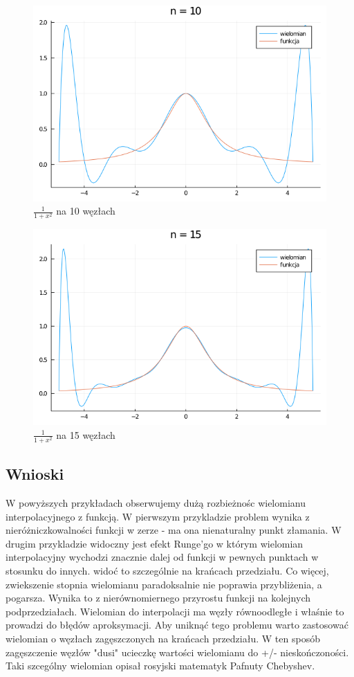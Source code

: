 \documentclass[12pt]{article}
\begin{document}
\begin{figure}[h!]
    \caption{$\frac{1}{1+x^2}$ na 10 węzłach}
    \centering
    \includegraphics[scale=0.5]{popz6g_10.png}
\end{figure}
\begin{figure}[h!]
    \caption{$\frac{1}{1+x^2}$ na 15 węzłach}
    \centering
    \includegraphics[scale=0.5]{z6g_15.png}
\end{figure}
\newpage
\subsection{Wnioski}
W powyższych przykładach obserwujemy dużą rozbieżnośc wielomianu interpolacyjnego z funkcją.
W pierwszym przykladzie problem wynika z nieróżniczkowalności funkcji w zerze - ma ona nienaturalny punkt złamania.
W drugim przykladzie widoczny jest efekt Runge'go w którym wielomian interpolacyjny wychodzi znacznie dalej od funkcji w pewnych punktach
w stosunku do innych. widoć to szczególnie na krańcach przedziału. Co więcej, zwiekszenie stopnia wielomianu paradoksalnie nie poprawia
przybliżenia, a pogarsza. Wynika to z nierównomiernego przyrostu funkcji na kolejnych podprzedziałach. Wielomian do interpolacji ma węzły równoodległe i właśnie to 
prowadzi do błędów aproksymacji.
Aby uniknąć tego problemu warto zastosować wielomian o węzłach zagęszczonych na krańcach przedziału. W ten sposób zagęszczenie węzłów "dusi" ucieczkę wartości wielomianu
do +/- nieskończoności. 
Taki szcególny wielomian opisał rosyjski matematyk Pafnuty Chebyshev.
\end{document}
